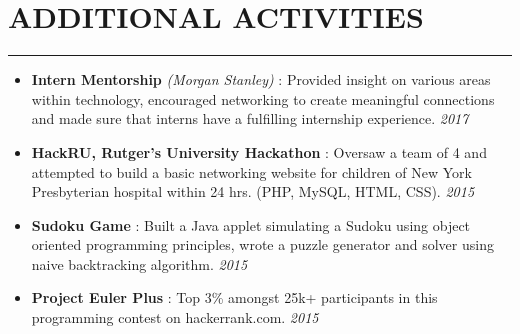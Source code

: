 \documentclass[12pt]{article}
\newcommand{\sectionHeading}[1]{
\vspace{-15pt}
\section*{\small{#1}}
\vspace{-10pt}
\hrule
\vspace{8pt}
}
\newcommand {\extracurricularSectionSubheading}[3]{
    \noindent \small{\textbf{#1} : #2 \hfill \textit{#3}} \\
    \vspace{-10pt}
}
\newcommand{\sectionListStart}{
    \begin{itemize}[label={\small{\textbullet}}, leftmargin=20pt] %
}
\newcommand{\sectionListStartWiderSpacing}{
    \begin{itemize}[label={\small{\textbullet}}, leftmargin=20pt, itemsep=-2pt] %
}
\newcommand{\sectionListStartNoBulletWiderSpacing}{
    \begin{itemize}[label={}, leftmargin=0pt, itemsep=-2pt] %
}
\newcommand{\sectionListEnd}{\end{itemize} \vspace{-5pt}}
\newcommand{\sectionListItem}[1]{\item \small{#1}}
\newcommand{\sectionListItemWithDate}[2]{\item \small{#1 \hfill \textit{#2}}}
\begin{document}
\sectionHeading{ADDITIONAL ACTIVITIES}


\sectionListStartWiderSpacing
\sectionListItemWithDate{\textbf{Intern Mentorship} \textit{(Morgan Stanley)} : Provided insight on various areas within technology, encouraged networking to create meaningful connections and made sure that interns have a fulfilling internship experience.}{2017}

\sectionListItemWithDate{\textbf{HackRU, Rutger's University Hackathon} : Oversaw a team of 4 and attempted to build a basic networking website for children of New York Presbyterian hospital within 24 hrs. (PHP, MySQL, HTML, CSS).}{2015}

\sectionListItemWithDate{\textbf{Sudoku Game} : Built a Java applet simulating a Sudoku using object oriented programming principles, wrote a puzzle generator and solver using naive backtracking algorithm.}{2015}


\sectionListItemWithDate{\textbf{Project Euler Plus} : Top 3\% amongst 25k+ participants in this programming contest on hackerrank.com.}{2015}



\sectionListEnd

\end{document}
